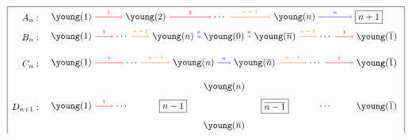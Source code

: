 \documentclass[11pt, leqno]{amsart}
\theoremstyle{plain}
\theoremstyle{definition}
\numberwithin{equation}{section}
\newcommand{\one}{\overline{1}}
\newcommand{\on}{\overline{n}}
\begin{document}

\begin{figure}
\[
\begin{array}{|rl|}\hline
A_n: &
\begin{tikzpicture}[xscale=1.9,baseline=-4]
\node (1) at (0,0) {$\young(1)$};
\node (2) at (1.5,0) {$\young(2)$};
\node (d) at (3.0,0) {$\cdots$};
\node (n-1) at (4.5,0) {$\young(n)$};
\node (n) at (6,0) {$\boxed{n+1}$};
\draw[->,red] (1) to node[above]{\tiny$1$} (2);
\draw[->,purple] (2) to node[above]{\tiny$2$} (d);
\draw[->,brown] (d) to node[above]{\tiny$n-1$} (n-1);
\draw[->,blue] (n-1) to node[above]{\tiny$n$} (n);
\end{tikzpicture}\\
B_n: &
\begin{tikzpicture}[xscale=1.3,baseline=-4]
\node (1) at (0,0) {$\young(1)$};
\node (d1) at (1.5,0) {$\cdots$};
\node (n) at (3,0) {$\young(n)$};
\node (0) at (4.5,0) {$\young(0)$};
\node (bn) at (6,0) {$\young(\on)$};
\node (d2) at (7.5,0) {$\cdots$};
\node (b1) at (9,0) {$\young(\one)$};
\draw[->,red] (1) to node[above]{\tiny$1$} (d1);
\draw[->,brown] (d1) to node[above]{\tiny$n-1$} (n);
\draw[->,blue] (n) to node[above]{\tiny$n$} (0);
\draw[->,blue] (0) to node[above]{\tiny$n$} (bn);
\draw[->,brown] (bn) to node[above]{\tiny$n-1$} (d2);
\draw[->,red] (d2) to node[above]{\tiny$1$} (b1);
\end{tikzpicture}
\\[10pt]
C_n: &
\begin{tikzpicture}[xscale=1.3,baseline=-4]
\node (1) at (0,0) {$\young(1)$};
\node (d1) at (1.8,0) {$\cdots$};
\node (n) at (3.6,0) {$\young(n)$};
\node (bn) at (5.4,0) {$\young(\on)$};
\node (d2) at (7.2,0) {$\cdots$};
\node (b1) at (9,0) {$\young(\one)$};
\draw[->,red] (1) to node[above]{\tiny$1$} (d1);
\draw[->,brown] (d1) to node[above]{\tiny$n-1$} (n);
\draw[->,blue] (n) to node[above]{\tiny$n$} (bn);
\draw[->,brown] (bn) to node[above]{\tiny$n-1$} (d2);
\draw[->,red] (d2) to node[above]{\tiny$1$} (b1);
\end{tikzpicture}
\\[10pt]
D_{n+1}: &
\begin{tikzpicture}[xscale=1.3,baseline=-4]
\node (1) at (0,0) {$\young(1)$};
\node (d1) at (1.5,0) {$\cdots$};
\node (n-1) at (3,0) {$\boxed{n-1}$};
\node (n) at (4.5,.75) {$\young(n)$};
\node (bn) at (4.5,-.75) {$\young(\on)$};
\node (bn-1) at (6,0) {$\boxed{\overline{n-1}}$};
\node (d2) at (7.5,0) {$\cdots$};
\node (b1) at (9,0) {$\young(\one)$};
\draw[->,red] (1) to node[above]{\tiny$1$} (d1);

\end{tikzpicture}
\end{array}\]
\end{figure}
\end{document}
